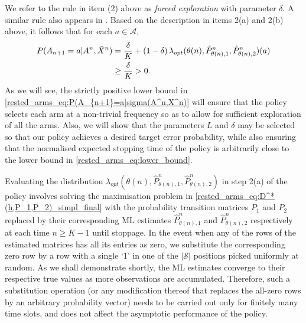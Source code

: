 {We refer to the rule in item (2) above as \emph{forced exploration} with parameter $\delta$. A similar rule also appears in \cite{albert1961sequential}. Based on the description in items 2(a) and 2(b) above, it follows that for each $a\in\mathcal{A}$,}
\begingroup\allowdisplaybreaks\begin{align}
	P(A_{n+1}=a|A^n,\bar{X}^n)
	&=\frac{\delta}{K}+(1-\delta)\,\lambda_{opt}(\theta(n),\hat{P}^n_{\theta(n),1},\hat{P}^n_{\theta(n),2})(a)\nonumber\\
	&\geq \frac{\delta}{K}>0.\label{rested_arms_eq:P(A_{n+1}=a|sigma(A^n,X^n)}
\end{align}\endgroup
As we will see, the strictly positive lower bound in \eqref{rested_arms_eq:P(A_{n+1}=a|sigma(A^n,X^n)} will ensure that the policy selects each arm at a non-trivial frequency so as to allow for sufficient exploration of all the arms. Also, we will show that the parameters $L$ and $\delta$ may be selected so that our policy achieves a desired target error probability, while also ensuring that the normalised expected stopping time of the policy is arbitrarily close to the lower bound in \eqref{rested_arms_eq:lower_bound}.

{
\begin{remark}
Evaluating the distribution $\lambda_{opt}(\theta(n),\hat{P}^n_{\theta(n),1},\hat{P}^n_{\theta(n),2})$ in step 2(a) of the policy involves solving the maximisation problem in \eqref{rested_arms_eq:D^*(h,P_1,P_2)_simpl_final} with the probability transition matrices $P_1$ and $P_2$ replaced by their corresponding ML estimates $\hat{P}^n_{\theta(n),1}$ and $\hat{P}^n_{\theta(n),2}$ respectively at each time $n\geq K-1$ until stoppage. In the event when any of the rows of the estimated matrices has all its entries as zero, we substitute the corresponding zero row by a row with a single `1' in one of the $|\mathcal{S}|$ positions picked uniformly at random. As we shall demonstrate shortly, the ML estimates converge to their respective true values as more observations are accumulated. Therefore, such a substitution operation (or any modification thereof that replaces the all-zero rows by an arbitrary probability vector) needs to be carried out only for finitely many time slots, and does not affect the asymptotic performance of the policy.
\end{remark}}

